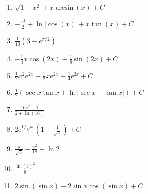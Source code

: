 \documentclass[letterpaper]{article}
\begin{document}
\begin{enumerate}
\begin{enumerate}
	\item $\sqrt{1-x^2}+x \arcsin(x)+C$

	\item $-\frac{x^2}{2}+\ln|\cos(x)|+x \tan(x)+C$

	\item $\frac{1}{10} \left(3-e^{\pi /2}\right)$

	\item $-\frac{1}{4} x \cos(2 x)+\frac{1}{8} \sin(2 x)+C$

	\item $\frac12 x^2 e^{2x}- \frac12xe^{2x}+\frac14e^{2x}+C$

	\item $\frac{1}{2}\left(\sec x \tan x + \ln | \sec x + \tan x| \right)+C$

	\item $\frac{16e^2-1}{2+\ln(16)}$

	\item $2e^{1/\sqrt{x}}\left(1-\frac{1}{\sqrt x}\right)+C$

	\item $\frac{\pi}{\sqrt{3}}-\frac{\pi^2}{18}-\ln 2$

	\item $\frac{\ln(3)^2}{8}$

	\item $2\sin(\sin x)-2\sin x\cos(\sin x)+C$
	\end{enumerate}


\end{enumerate}
\end{document}
